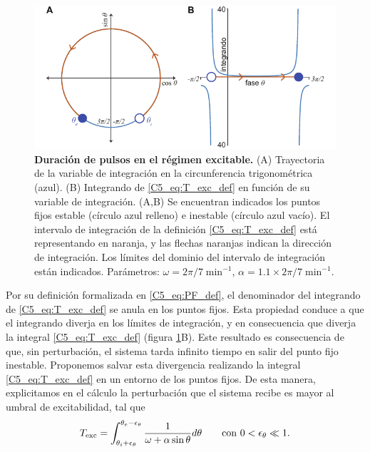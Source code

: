 \documentclass[./main.tex]{subfiles}
\begin{document}
 \begin{figure}
    \centering
    \includegraphics[width=1\columnwidth]{figures/chapter5/C5_T_exc_def.pdf} 
    \caption{\textbf{Duración de pulsos en el régimen excitable.} (A) Trayectoria de la variable de integración en la circunferencia trigonométrica (azul). (B) Integrando de \ref{C5_eq:T_exc_def} en función de su variable de integración. (A,B) Se encuentran indicados los puntos fijos estable \xxe (círculo azul relleno) e inestable \xxi (círculo azul vacío). El intervalo de integración de la definición \ref{C5_eq:T_exc_def} está representando en naranja, y  las flechas naranjas indican la dirección de integración. Los límites del dominio del intervalo de integración están indicados. Parámetros: $\omega=2\pi/7\;\text{min}^{-1}$, $\alpha = 1.1 \times 2\pi/7\;\text{min}^{-1}$.}
    \label{C5_fig:T_exc_def}
\end{figure}


Por su definición formalizada en \ref{C5_eq:PF_def}, el denominador del integrando de \ref{C5_eq:T_exc_def} se anula en los puntos fijos. Esta propiedad conduce a que el integrando diverja en los límites de integración, y en consecuencia que diverja la integral \ref{C5_eq:T_exc_def} (figura \ref{C5_fig:T_exc_def}B). Este resultado es consecuencia de que, sin perturbación, el sistema tarda infinito tiempo en salir del punto fijo inestable. Proponemos salvar esta divergencia realizando la integral \ref{C5_eq:T_exc_def} en un entorno de los puntos fijos. De esta manera, explicitamos en el cálculo la perturbación que el sistema recibe es mayor al umbral de excitabilidad, tal que
\begin{align}
    T_{\text{exc}} = \int_{\theta_i+\epsilon_\theta}^{\theta_e-\epsilon_\theta}  \frac{1}{\omega + \alpha \sin{\ensuremath{\theta}}} d\theta \qquad \text{con } 0<\epsilon_\theta \ll 1.
    \label{C5_eq:T_exc_def_eps}
\end{align}


\end{document}

